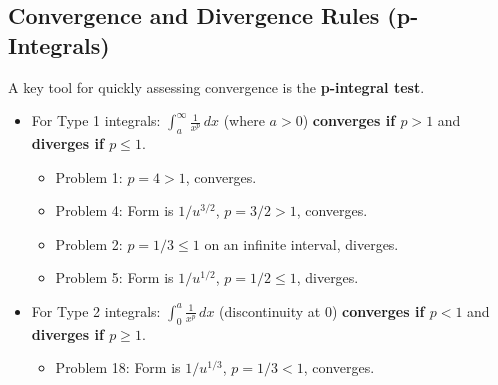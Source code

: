 \documentclass{article}
\begin{document}
\subsection{Convergence and Divergence Rules (p-Integrals)}
A key tool for quickly assessing convergence is the \textbf{p-integral test}.
\begin{itemize}
    \item For Type 1 integrals: $ \int_{a}^{\infty} \frac{1}{x^p} \,dx $ (where $a > 0$) \textbf{converges if $p > 1$} and \textbf{diverges if $p \le 1$}.
        \begin{itemize}
            \item Problem 1: $p=4 > 1$, converges.
            \item Problem 4: Form is $1/u^{3/2}$, $p=3/2 > 1$, converges.
            \item Problem 2: $p=1/3 \le 1$ on an infinite interval, diverges.
            \item Problem 5: Form is $1/u^{1/2}$, $p=1/2 \le 1$, diverges.
        \end{itemize}
    \item For Type 2 integrals: $ \int_{0}^{a} \frac{1}{x^p} \,dx $ (discontinuity at 0) \textbf{converges if $p < 1$} and \textbf{diverges if $p \ge 1$}.
        \begin{itemize}
            \item Problem 18: Form is $1/u^{1/3}$, $p=1/3 < 1$, converges.
        \end{itemize}
\end{itemize}
\end{document}
